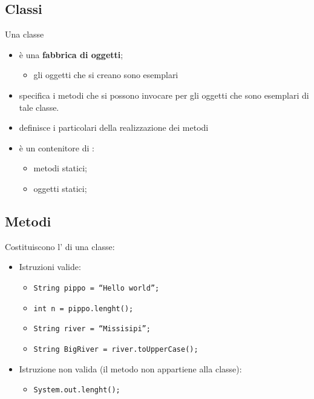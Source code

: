 \subsection*{Classi}
\begin{frame}
\begin{block}{Una classe}
\begin{itemize}
\item è una \textbf{fabbrica di oggetti};
\begin{itemize}
\item gli oggetti che si creano sono \alert{esemplari}
\end{itemize}
\item specifica i metodi che si possono invocare per gli oggetti che sono esemplari di tale classe.
\item definisce i particolari della realizzazione dei metodi
\item è un contenitore di :
\begin{itemize}
\item metodi statici;
\item oggetti statici;
\end{itemize}
\end{itemize}
\end{block}
\end{frame}

\subsection*{Metodi}
\begin{frame}
\begin{block}{}
Costituiscono l' di una classe:
\begin{itemize}
\item Istruzioni valide:
\begin{itemize}
\item \texttt{String pippo = ``Hello world'';}
\item \texttt{int n = pippo.\alert{lenght()};}
\item \texttt{String river = ``Missisipi'';}
\item \texttt{String BigRiver = river.\alert{toUpperCase();}}
\end{itemize}
\item Istruzione non valida (il metodo non appartiene alla classe):
\begin{itemize}
\item \texttt{System.out\alert{.lenght();}}
\end{itemize}
\end{itemize}
\end{block}
\end{frame}
